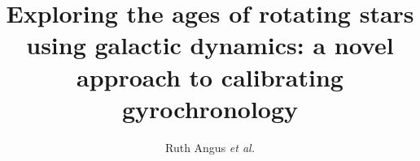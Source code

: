 \documentclass[useAMS, usenatbib, preprint, 12pt]{aastex}
\newcommand{\etal}{{\it et al.}}
\newcommand{\amnh}{1}
\newcommand{\cca}{2}
\newcommand{\hawaii}{3}
\begin{document}
\title{Exploring the ages of rotating stars using galactic dynamics: a novel
approach to calibrating gyrochronology}

\author{%
    Ruth Angus \etal}




\begin{abstract}
    
\end{abstract}







% 







\end{document}
